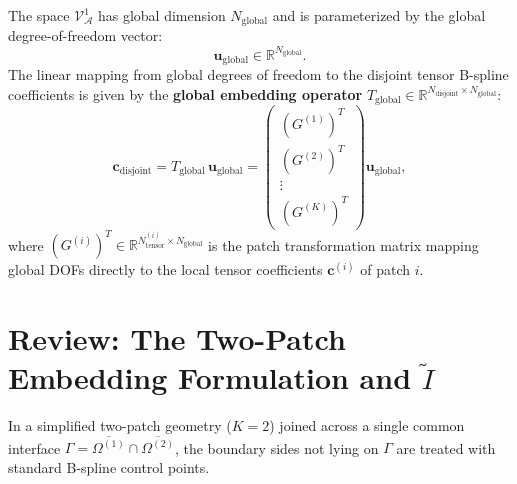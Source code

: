 \documentclass[11pt,a4paper]{article}
\newcommand{\R}{\mathbb{R}}
\begin{document}
The space $\mathcal{V}_{\mathcal{A}}^1$ has global dimension $N_{\text{global}}$ and is parameterized by the global degree-of-freedom vector:
\begin{equation}
    \mathbf{u}_{\text{global}} \in \R^{N_{\text{global}}}.
\end{equation}
The linear mapping from global degrees of freedom to the disjoint tensor B-spline coefficients is given by the \textbf{global embedding operator} $T_{\text{global}} \in \R^{N_{\text{disjoint}} \times N_{\text{global}}}$:
\begin{equation} \label{eq:T_global_def}
    \mathbf{c}_{\text{disjoint}} = T_{\text{global}} \, \mathbf{u}_{\text{global}} = \begin{pmatrix} (G^{(1)})^T \\ (G^{(2)})^T \\ \vdots \\ (G^{(K)})^T \end{pmatrix} \mathbf{u}_{\text{global}},
\end{equation}
where $(G^{(i)})^T \in \R^{N_{\text{tensor}}^{(i)} \times N_{\text{global}}}$ is the patch transformation matrix mapping global DOFs directly to the local tensor coefficients $\mathbf{c}^{(i)}$ of patch $i$.

\newpage
\section{Review: The Two-Patch Embedding Formulation and \texorpdfstring{$\widetilde{I}$}{I-tilde}}

In a simplified two-patch geometry ($K=2$) joined across a single common interface $\Gamma = \overline{\Omega^{(1)}} \cap \overline{\Omega^{(2)}}$, the boundary sides not lying on $\Gamma$ are treated with standard B-spline control points.
\end{document}

